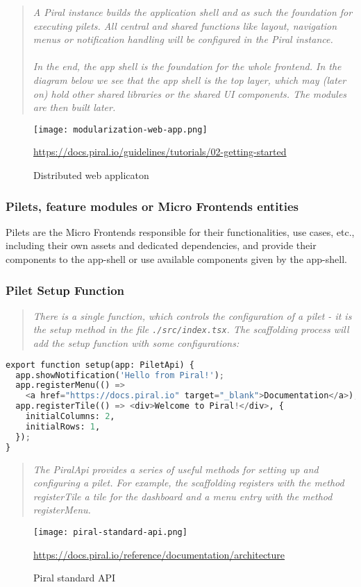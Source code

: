 \documentclass[a4paper]{book}
\begin{document}
\begin{quote}
    \textit{A Piral instance builds the application shell and as such the foundation for executing pilets. All central and shared functions like layout, navigation menus or notification handling will be configured in the Piral instance.
\\ \\ 
In the end, the app shell is the foundation for the whole frontend. In the diagram below we see that the app shell is the top layer, which may (later on) hold other shared libraries or the shared UI components. The modules are then built later.} 
\end{quote}

\begin{figure}[h!]
  \centering
  \captionsetup{justification=centering}
  \texttt{[image: modularization-web-app.png]}
  \caption{Distributed web applicaton}
  \url{https://docs.piral.io/guidelines/tutorials/02-getting-started }
  \label{fig:7}
\end{figure}

\subsubsection{Pilets, feature modules or Micro Frontends entities }

Pilets are the Micro Frontends responsible for their functionalities, use cases, etc., including their own assets and dedicated dependencies, and provide their components to the app-shell or use available components given by the app-shell.

\subsubsection{Pilet Setup Function}

\begin{quote}
\textit{There is a single function, which controls the configuration of a pilet - it is the setup method in the file \verb|./src/index.tsx|. The scaffolding process will add the setup function with some configurations:}
\end{quote}
\begin{lstlisting}[language=Python]
export function setup(app: PiletApi) {
  app.showNotification('Hello from Piral!');
  app.registerMenu(() =>
    <a href="https://docs.piral.io" target="_blank">Documentation</a>);
  app.registerTile(() => <div>Welcome to Piral!</div>, {
    initialColumns: 2,
    initialRows: 1,
  });
}
\end{lstlisting}
\begin{quote}
\textit{The PiralApi provides a series of useful methods for setting up and configuring a pilet. For example, the scaffolding registers with the method registerTile a tile for the dashboard and a menu entry with the method registerMenu.}
\end{quote}
\begin{figure}[h!]
  \centering
  \captionsetup{justification=centering}
  \texttt{[image: piral-standard-api.png]}
  \caption{Piral standard API}
  \url{https://docs.piral.io/reference/documentation/architecture}
  \label{fig:piral-standard}
\end{figure}
\end{document}
